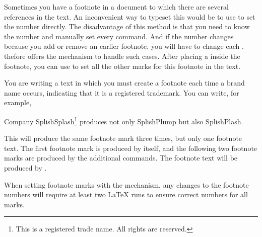 \begin{Declaration}
\end{Declaration}
Sometimes you have a footnote in a document to which there are several references
in the text. An inconvenient way to typeset this would be to use
 to set the number directly.
The disadvantage of this method is that you need to know the number and
manually set every  command.
And if the number changes because you add or remove an earlier footnote, you
will have to change each .
\KOMAScript{} thefore offers the %
 mechanism to handle such cases. After placing a
 inside the footnote, you can use  to set all the
other marks for this footnote in the text.
\IfThisCommonFirstRun{\iftrue}{\csname iffalse\endcsname}%
  \begin{Example}
    You are writing a text in which you must create a footnote each time a
    brand name occurs, indicating that it is a registered trademark. You can
    write, for example,
\begin{lstcode}
  Company SplishSplash\footnote{This is a registered trade name.
    All rights are reserved.\label{refnote}}
  produces not only SplishPlump
  but also SplishPlash.
\end{lstcode}
    This will produce the same footnote mark three times, but only one
    footnote text. The first footnote mark is produced by
     itself, and the following two
    footnote marks are produced by the additional 
    commands. The footnote text will be produced by
    . 
  \end{Example}
  \fi When setting footnote marks with the  mechanism, any
  changes to the footnote numbers will require at least two \LaTeX{} runs to
  ensure correct numbers for all  marks.%
\EndIndexGroup


